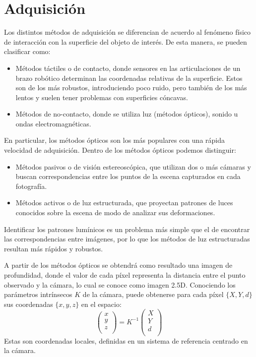 \section{Adquisición}
Los distintos métodos de adquisición se diferencian de acuerdo al fenómeno físico de interacción
con la superficie del objeto de interés. De esta manera, se pueden clasificar como:
	\begin{itemize}
		\item Métodos táctiles o de contacto, donde sensores en las articulaciones de un brazo robótico determinan las coordenadas relativas de la superficie. Estos son de los más robustos, introduciendo poco ruido, pero también de los más lentos y suelen tener problemas con superficies cóncavas.
		\item Métodos de no-contacto, donde se utiliza luz (métodos ópticos), sonido u ondas electromagnéticas.
	\end{itemize}

En particular, los métodos ópticos son los más populares con una rápida velocidad de adquisición\cite{Várady97reverseengineering}. %
Dentro de los métodos ópticos podemos distinguir:
\begin{itemize}
	\item Métodos pasivos o de visión estereoscópica,
		que utilizan dos o más cámaras y buscan correspondencias
		entre los puntos de la escena capturados en cada fotografía.
	\item Métodos activos o de luz estructurada,
		que proyectan patrones de luces conocidos sobre la escena de modo de analizar sus deformaciones.
\end{itemize}
Identificar los patrones lumínicos es un problema más simple que el de
encontrar las correspondencias entre imágenes, por lo que los métodos de luz
estructuradas resultan más rápidos y robustos\cite{Pancho}.

A partir de los métodos ópticos se obtendrá como resultado una imagen de profundidad, donde el valor de
cada píxel representa la distancia entre el punto observado y la cámara, lo cual se conoce como imagen 2.5D.
Conociendo los parámetros intrínsecos $K$ de la cámara,
puede obtenerse para cada píxel $\{X, Y, d\}$ sus coordenadas $\{x, y, z\}$ en el espacio:
\[
	\left(\begin{matrix}
		x \\ y \\ z \\
	\end{matrix}\right) = 
	K^{-1}
	\left(\begin{matrix}
		X \\ Y \\ d \\
	\end{matrix}\right)
\]
Estas son coordenadas locales, definidas en un sistema de referencia centrado en la cámara.


